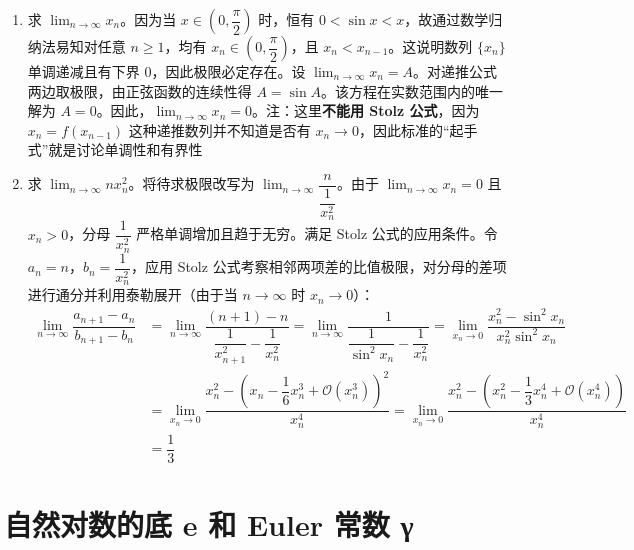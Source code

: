 \begin{enumerate}
  \item {求 $\displaystyle \lim_{n \to \infty} x_n$。因为当 $\displaystyle x \in \left( 0, \dfrac{\pi}{2} \right)$ 时，恒有 $\displaystyle 0 < \sin x < x$，故通过数学归纳法易知对任意 $\displaystyle n \ge 1$，均有 $\displaystyle x_n \in \left( 0, \dfrac{\pi}{2} \right)$，且 $\displaystyle x_n < x_{n-1}$。这说明数列 $\displaystyle \lbrace x_n \rbrace$ 单调递减且有下界 $\displaystyle 0$，因此极限必定存在。设 $\displaystyle \lim_{n \to \infty} x_n = A$。对递推公式两边取极限，由正弦函数的连续性得 $\displaystyle A = \sin A$。该方程在实数范围内的唯一解为 $\displaystyle A = 0$。因此，$\displaystyle \lim_{n \to \infty} x_n = 0$。注：这里\textbf{不能用 Stolz 公式}，因为 $\displaystyle x_n = f(x_{n-1})$ 这种递推数列并不知道是否有 $\displaystyle x_n \to 0$，因此标准的“起手式”就是讨论单调性和有界性

}\item {求 $\displaystyle \lim_{n \to \infty} nx_n^2$。将待求极限改写为 $\displaystyle \lim_{n \to \infty} \dfrac{n}{\dfrac{1}{x_n^2}}$。由于 $\displaystyle \lim_{n \to \infty} x_n = 0$ 且 $\displaystyle x_n > 0$，分母 $\displaystyle \dfrac{1}{x_n^2}$ 严格单调增加且趋于无穷。满足 Stolz 公式的应用条件。令 $\displaystyle a_n = n$，$\displaystyle b_n = \dfrac{1}{x_n^2}$，应用 Stolz 公式考察相邻两项差的比值极限，对分母的差项进行通分并利用泰勒展开（由于当 $\displaystyle n \to \infty$ 时 $\displaystyle x_n \to 0$）：$$
\begin{aligned}\lim_{n \to \infty} \dfrac{a_{n+1} - a_n}{b_{n+1} - b_n} &= \lim_{n \to \infty} \dfrac{(n+1) - n}{\dfrac{1}{x_{n+1}^2} - \dfrac{1}{x_n^2}} = \lim_{n \to \infty} \dfrac{1}{\dfrac{1}{\sin^2 x_n} - \dfrac{1}{x_n^2}}= \lim_{x_n \to 0} \dfrac{x_n^2 - \sin^2 x_n}{x_n^2 \sin^2 x_n} \\ &= \lim_{x_n \to 0} \dfrac{x_n^2 - \left( x_n - \dfrac{1}{6}x_n^3 + \mathcal{O}(x_n^3) \right)^2}{x_n^4} = \lim_{x_n \to 0} \dfrac{x_n^2 - \left( x_n^2 - \dfrac{1}{3}x_n^4 + \mathcal{O}(x_n^4) \right)}{x_n^4} \\ &= \dfrac{1}{3}\end{aligned}$$



}
\end{enumerate}

\section{自然对数的底 e 和 Euler 常数 γ}


